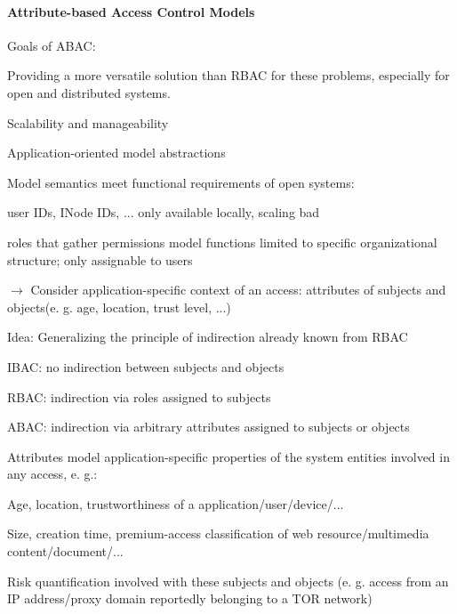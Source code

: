 \documentclass[a4paper]{article}
\begin{document}
\begin{multicols}{3}
    \paragraph{Attribute-based Access Control Models}
    Goals of ABAC:
    \begin{itemize*}
        \item Providing a more versatile solution than RBAC for these problems, especially for open and distributed systems.
              \begin{itemize*}
                  \item Scalability and manageability
                  \item Application-oriented model abstractions
                  \item Model semantics meet functional requirements of open systems:
                        \begin{itemize*}
                            \item user IDs, INode IDs, ... only available locally, scaling bad
                            \item roles that gather permissions model functions limited to specific organizational structure; only assignable to users
                        \end{itemize*}
                  \item $\rightarrow$ Consider application-specific context of an access: attributes of subjects and objects(e. g. age, location, trust level, ...)
              \end{itemize*}
    \end{itemize*}

    Idea: Generalizing the principle of indirection already known from RBAC
    \begin{itemize*}
        \item IBAC: no indirection between subjects and objects
        \item RBAC: indirection via roles assigned to subjects
        \item ABAC: indirection via arbitrary attributes assigned to subjects or objects
        \item Attributes model application-specific properties of the system entities involved in any access, e. g.:
              \begin{itemize*}
                  \item Age, location, trustworthiness of a application/user/device/...
                  \item Size, creation time, premium-access classification of web resource/multimedia content/document/...
                  \item Risk quantification involved with these subjects and objects (e. g. access from an IP address/proxy domain reportedly belonging to a TOR network)
              \end{itemize*}
    \end{itemize*}


\end{multicols}
\end{document}
